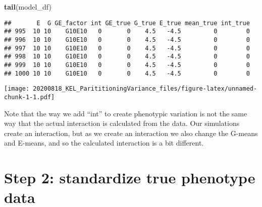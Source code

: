 \documentclass[]{article}
\newenvironment{Shaded}{\begin{snugshade}}{\end{snugshade}}
\newcommand{\DataTypeTok}[1]{\textcolor[rgb]{0.13,0.29,0.53}{#1}}
\newcommand{\DecValTok}[1]{\textcolor[rgb]{0.00,0.00,0.81}{#1}}
\newcommand{\KeywordTok}[1]{\textcolor[rgb]{0.13,0.29,0.53}{\textbf{#1}}}
\newcommand{\NormalTok}[1]{#1}
\newcommand{\OperatorTok}[1]{\textcolor[rgb]{0.81,0.36,0.00}{\textbf{#1}}}
\begin{document}
\begin{Shaded}
\begin{Highlighting}[]
    \KeywordTok{tail}\NormalTok{(model_df)}
\end{Highlighting}
\end{Shaded}

\begin{verbatim}
##       E  G GE_factor int GE_true G_true E_true mean_true int_true
## 995  10 10    G10E10   0       0    4.5   -4.5         0        0
## 996  10 10    G10E10   0       0    4.5   -4.5         0        0
## 997  10 10    G10E10   0       0    4.5   -4.5         0        0
## 998  10 10    G10E10   0       0    4.5   -4.5         0        0
## 999  10 10    G10E10   0       0    4.5   -4.5         0        0
## 1000 10 10    G10E10   0       0    4.5   -4.5         0        0
\end{verbatim}

\begin{Shaded}
\end{Shaded}

\texttt{[image: 20200818\_KEL\_ParititioningVariance\_files/figure-latex/unnamed-chunk-1-1.pdf]}

Note that the way we add ``int'' to create phenotypic variation is not
the same way that the actual interaction is calculated from the data.
Our simulations create an interaction, but as we create an interaction
we also change the G-means and E-means, and so the calculated
interaction is a bit different.

\hypertarget{step-2-standardize-true-phenotype-data}{%
\section{Step 2: standardize true phenotype
data}\label{step-2-standardize-true-phenotype-data}}
\end{document}
